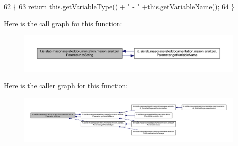 \begin{DoxyCode}
62                             \{
63         \textcolor{keywordflow}{return} this.getVariableType() + \textcolor{stringliteral}{" - "} +this.\hyperlink{classit_1_1isislab_1_1masonassisteddocumentation_1_1mason_1_1analizer_1_1_parameter_aeb5c13b8a5bb75063046297b440da70b}{getVariableName}();
64     \}
\end{DoxyCode}


Here is the call graph for this function\-:\nopagebreak
\begin{figure}[H]
\begin{center}
\leavevmode
\includegraphics[width=350pt]{classit_1_1isislab_1_1masonassisteddocumentation_1_1mason_1_1analizer_1_1_parameter_a35e65b1fda861615ad93b81d814dda05_cgraph}
\end{center}
\end{figure}




Here is the caller graph for this function\-:\nopagebreak
\begin{figure}[H]
\begin{center}
\leavevmode
\includegraphics[width=350pt]{classit_1_1isislab_1_1masonassisteddocumentation_1_1mason_1_1analizer_1_1_parameter_a35e65b1fda861615ad93b81d814dda05_icgraph}
\end{center}
\end{figure}




